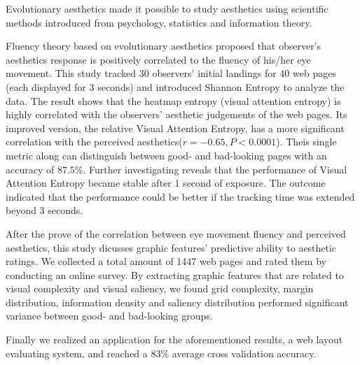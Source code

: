 \begin{englishabstract}

Evolutionary aesthetics made it possible to study aesthetics using scientific methods introduced from psychology, statistics and information theory.

Fluency theory based on evolutionary aesthetics proposed that observer's aesthetics response is positively correlated to the fluency of his/her eye movement. This study tracked 30 observers' initial landings for 40 web pages (each displayed for 3 seconds) and introduced Shannon Entropy to analyze the data. The result shows that the heatmap entropy (visual attention entropy) is highly correlated with the observers' aesthetic judgements of the web pages. Its improved version, the relative Visual Attention Entropy, has a more significant correlation with the perceived aesthetics($r = -0.65, P < 0.0001$). Theis single metric along can distinguish between good- and bad-looking pages with an accuracy of $87.5\%$. Further investigating reveals that the performance of Visual Attention Entropy became stable after 1 second of exposure. The outcome indicated that the performance could be better if the tracking time was extended beyond 3 seconds.

After the prove of the correlation between eye movement fluency and perceived aesthetics, this study dicusses graphic features' predictive ability to aesthetic ratings.
We collected a total amount of 1447 web pages and rated them by conducting an online survey. By extracting graphic features that are related to visual complexity and visual saliency, we found grid complexity, margin distribution, information density and saliency distribution performed significant variance between good- and bad-looking groups.

Finally we realized an application for the aforementioned results, a web layout evaluating system, and reached a $83\%$ average cross validation accuracy. 

\end{englishabstract}
